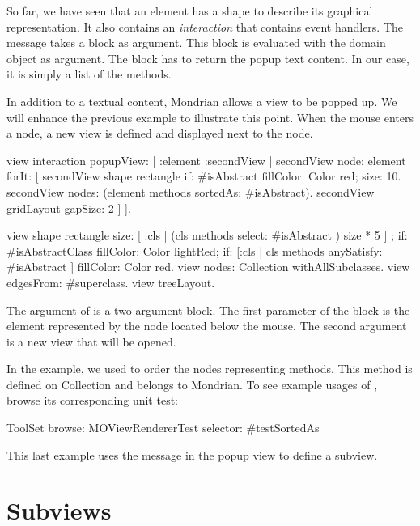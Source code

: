 \documentclass[a4paper,10pt,twoside]{book}
\begin{document}
So far, we have seen that an element has a shape to describe its graphical representation. It also contains an \emph{interaction} that contains event handlers. The message  takes a block as argument. This block is evaluated with the domain object as argument. The block has to return the popup text content. In our case, it is simply a list of the methods.

In addition to a textual content, Mondrian allows a view to be popped up. We will enhance the previous example to illustrate this point. When the mouse enters a node, a new view is defined and displayed next to the node. %

\begin{code}{}
view interaction popupView: [ :element :secondView | 
	secondView node: element forIt: [
	  secondView shape rectangle 
	    if: #isAbstract fillColor: Color red;
	    size: 10.  
	  secondView nodes: (element methods sortedAs: #isAbstract).
	  secondView gridLayout gapSize: 2 
	] ].

view shape rectangle
	size: [ :cls | (cls methods select:  #isAbstract ) size * 5 ] ;
	if: #isAbstractClass fillColor: Color lightRed;
	if: [:cls | cls methods anySatisfy: #isAbstract ] fillColor: Color red.
view nodes: Collection withAllSubclasses.
view edgesFrom: #superclass.
view treeLayout.
\end{code}

The argument of  is a two argument block. The first parameter of the block is the element represented by the node located below the mouse. The second argument is a new view that will be opened.

In the example, we used  to order the nodes representing methods. This method is defined on Collection and belongs to Mondrian. To see example usages of , browse its corresponding unit test:
\begin{code}{}
ToolSet browse: MOViewRendererTest selector: #testSortedAs 
\end{code}

This last example uses the message  in the popup view to define a subview.


\section{Subviews}
\end{document}
